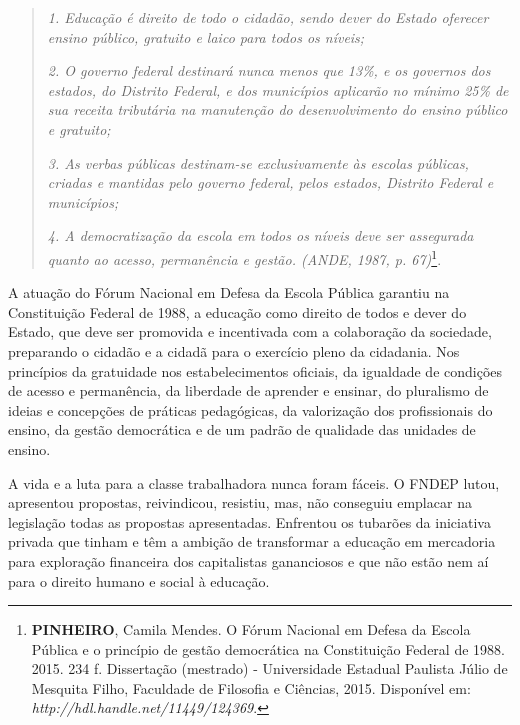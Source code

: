 \begin{quote}
\emph{1. Educação é direito de todo o cidadão, sendo dever do Estado
oferecer ensino público, gratuito e laico para todos os níveis;}

\emph{2. O governo federal destinará nunca menos que 13\%, e os governos
dos estados, do Distrito Federal, e dos municípios aplicarão no mínimo
25\% de sua receita tributária na manutenção do desenvolvimento do
ensino público e gratuito; }

\emph{3. As verbas públicas destinam-se exclusivamente às escolas
públicas, criadas e mantidas pelo governo federal, pelos estados,
Distrito Federal e municípios; }

\emph{4. A democratização da escola em todos os níveis deve ser
assegurada quanto ao acesso, permanência e gestão. (ANDE, 1987, p.
67)}\footnote{\textbf{PINHEIRO}, Camila Mendes. O Fórum Nacional em
  Defesa da Escola Pública e o princípio de gestão democrática na
  Constituição Federal de 1988. 2015. 234 f. Dissertação (mestrado) -
  Universidade Estadual Paulista Júlio de Mesquita Filho, Faculdade de
  Filosofia e Ciências, 2015. Disponível em:
  \emph{http://hdl.handle.net/11449/124369}.}.
\end{quote}

A atuação do Fórum Nacional em Defesa da Escola Pública garantiu na
Constituição Federal de 1988, a educação como direito de todos e dever
do Estado, que deve ser promovida e incentivada com a colaboração da
sociedade, preparando o cidadão e a cidadã para o exercício pleno da
cidadania. Nos princípios da gratuidade nos estabelecimentos oficiais,
da igualdade de condições de acesso e permanência, da liberdade de
aprender e ensinar, do pluralismo de ideias e concepções de práticas
pedagógicas, da valorização dos profissionais do ensino, da gestão
democrática e de um padrão de qualidade das unidades de ensino.

A vida e a luta para a classe trabalhadora nunca foram fáceis. O FNDEP
lutou, apresentou propostas, reivindicou, resistiu, mas, não conseguiu
emplacar na legislação todas as propostas apresentadas. Enfrentou os
tubarões da iniciativa privada que tinham e têm a ambição de transformar
a educação em mercadoria para exploração financeira dos capitalistas
gananciosos e que não estão nem aí para o direito humano e social à
educação.

